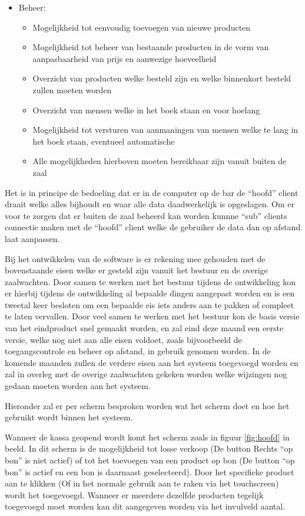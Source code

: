 \begin{itemize}
        \item Beheer:
        \begin{itemize}
        \item Mogelijkheid tot eenvoudig toevoegen van nieuwe producten
        \item Mogelijkheid tot beheer van bestaande producten in de vorm van aanpasbaarheid van prijs en aanwezige hoeveelheid
        \item Overzicht van producten welke besteld zijn en welke binnenkort besteld zullen moeten worden
        \item Overzicht van mensen welke in het boek staan en voor hoelang
        \item Mogelijkheid tot versturen van aanmaningen van mensen welke te lang in het boek staan, eventueel automatische
        \item Alle mogelijkheden hierboven moeten bereikbaar zijn vanuit buiten de zaal
        \end{itemize}
\end{itemize}
Het is in principe de bedoeling dat er in de computer op de bar de ``hoofd'' client draait welke alles bijhoudt en waar alle data daadwerkelijk is opgeslagen. Om er voor te zorgen dat er buiten de zaal beheerd kan worden kunnne ``sub'' clients connectie maken met de ``hoofd'' client welke de gebruiker de data dan op afstand laat aanpassen.

Bij het ontwikkelen van de software is er rekening mee gehouden met de bovenstaande eisen welke er gesteld zijn vanuit het bestuur en de overige zaalwachten. Door samen te werken met het bestuur tijdens de ontwikkeling kon er hierbij tijdens de ontwikkeling al bepaalde dingen aangepast worden en is een tweetal keer besloten om een bepaalde eis iets anders aan te pakken of compleet te laten vervallen. Door veel samen te werken met het bestuur kon de basis versie van het eindproduct snel gemaakt worden, en zal eind deze maand een eerste versie, welke nog niet aan alle eisen voldoet, zoals bijvoorbeeld de toegangscontrole en beheer op afstand, in gebruik genomen worden. In de komende maanden zullen de verdere eisen aan het systeem toegevoegd worden en zal in overleg met de overige zaalwachten gekeken worden welke wijzingen nog gedaan moeten worden aan het systeem.

Hieronder zal er per scherm besproken worden wat het scherm doet en hoe het gebruikt wordt binnen het systeem.

Wanneer de kassa geopend wordt komt het scherm zoals in figuur \ref{fig:hoofd} in beeld. In dit scherm is de mogelijkheid tot losse verkoop (De button Rechts ``op bon'' is niet actief) of tot het toevoegen van een product op bon (De button ``op bon'' is actief en een bon is daarnaast geselecteerd). Door het specifieke product aan te klikken (Of in het normale gebruik aan te raken via het touchscreen) wordt het toegevoegd. Wanneer er meerdere dezelfde producten tegelijk toegevoegd moet worden kan dit aangegeven worden via het invulveld aantal.

